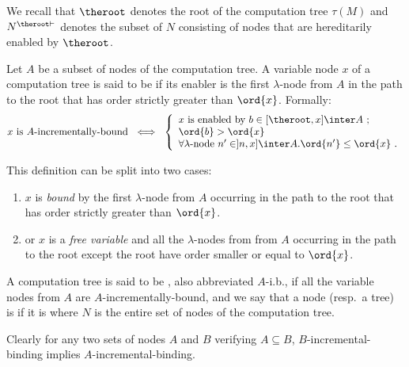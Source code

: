 We recall that $\theroot$ denotes the root of the computation tree
$\tau(M)$ and $N^{\theroot\vdash}$ denotes the subset of $N$
consisting of nodes that are hereditarily enabled by $\theroot$.



\begin{definition}
Let $A$ be a subset of nodes of the computation tree. A variable
node $x$ of a computation tree is said to be
 if its enabler is the first
$\lambda$-node from $A$ in the path to the root that has order
strictly greater than $\ord{x}$. Formally:
\begin{align*}
x \mbox{ is $A$-incrementally-bound} \  \iff \  \left\{
                                                  \begin{array}{ll}
                                                    x \hbox{ is enabled by } b \in [\theroot,x]\inter A \ ; \\
                                                    \ord{b} > \ord{x} \;\\
                                                    \forall \lambda\mbox{-node } n' \in ]n,x]\inter A  . \ord{n'} \leq \ord{x} \ .
                                                  \end{array}
                                                \right.
\end{align*}

This definition can be split into two cases:
\begin{enumerate}
\item $x$ is \emph{bound} by the first $\lambda$-node from $A$ occurring in the path to the root that has
order strictly greater than $\ord{x}$.
\item or $x$ is a \emph{free variable} and all the $\lambda$-nodes from from $A$ occurring in the path to the root except the root have order
 smaller or equal to $\ord{x}$.
\end{enumerate}

A computation tree is said to be ,
also abbreviated $A$-i.b., if all the variable nodes from $A$ are
$A$-incrementally-bound, and we say that a node (resp.\ a tree) is
 if it is
 where $N$ is the entire set of nodes of the computation tree.
\end{definition}

Clearly for any two sets of nodes $A$ and $B$ verifying $A\subseteq
B$, $B$-incremental-binding implies
$A$-incremental-binding.


